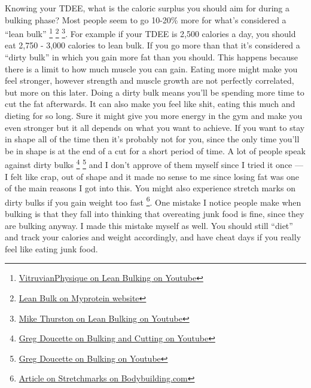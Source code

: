 \documentclass[openany, 12pt]{book}
\begin{document}
	Knowing your TDEE, what is the caloric surplus you should aim for during a bulking phase? Most people seem to go 10-20\% more for what's considered a ``lean bulk''
        \footnote{\href{https://www.youtube.com/watch?v=rCdba0UPTMk}{VitruvianPhysique on Lean Bulking on Youtube}}
        \footnote{\href{https://us.myprotein.com/thezone/nutrition/the-lean-bulk-how-to-minimize-fat-gain-while-bulking/}{Lean Bulk on Myprotein website}}
        \footnote{\href{https://www.youtube.com/watch?v=Ci3qXtNFU_w}{Mike Thurston on Lean Bulking on Youtube}}.
        For example if your TDEE is 2,500 calories a day, you should eat 2,750 - 3,000 calories to lean bulk. If you go more than that it's considered a ``dirty bulk'' in which you gain more fat than
        you should. This happens because there is a limit to how much muscle you can gain. Eating more might make you feel stronger, however strength and muscle growth are not perfectly correlated,
        but more on this later. Doing a dirty bulk means you'll be spending more time to cut the fat afterwards. It can also make you feel like shit, eating this much and dieting for so long.
        Sure it might give you more energy in the gym and make you even stronger but it all depends on what you want to achieve. If you want to stay in shape all of the time then it's probably not for you,
        since the only time you'll be in shape is at the end of a cut for a short period of time. A lot of people speak against dirty bulks
        \footnote{\href{https://www.youtube.com/watch?v=DjEnkzhz5T4}{Greg Doucette on Bulking and Cutting on Youtube}}
        \footnote{\href{https://www.youtube.com/watch?v=xl0ZNFcvuJI}{Greg Doucette on Bulking on Youtube}} and I don't approve of them myself since I tried it once --- I felt like crap, out of shape and
        it made no sense to me since losing fat was one of the main reasons I got into this. You might also experience stretch marks on dirty bulks if you gain weight too fast
        \footnote{\href{https://www.bodybuilding.com/content/stretchmark-maintenance.html}{Article on Stretchmarks on Bodybuilding.com}}. One mistake I notice people make when bulking is that they
        fall into thinking that overeating junk food is fine, since they are bulking anyway. I made this mistake myself as well. You should still ``diet'' and track your calories and weight accordingly,
        and have cheat days if you really feel like eating junk food.
	
\end{document}
